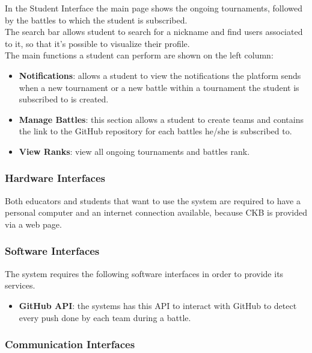 \newpage

In the Student Interface the main page shows the ongoing tournaments, followed by the battles to which the student is subscribed. \\The search bar allows student to search for a nickname and find users associated to it, so that it's possible to visualize their profile. \\The main functions a student can perform are shown on the left column:
\begin{itemize}
    \item \textbf{Notifications}: allows a student to view the notifications the platform sends when a new tournament or a new battle within a tournament the student is subscribed to is created.
    \item \textbf{Manage Battles}: this section allows a student to create teams and contains the link to the GitHub repository for each battles he/she is subscribed to. 
    \item \textbf{View Ranks}: view all ongoing tournaments and battles rank.
\end{itemize}


\vspace{60pt}

\subsubsection{Hardware Interfaces}

Both educators and students that want to use the system are required to have a personal computer and an internet connection available, because CKB is provided via a web page.

\vspace{20pt}

\subsubsection{Software Interfaces}

The system requires the following software interfaces in order to provide its services. 
\begin{itemize}
    \item \textbf{GitHub API}: the systems has this API to interact with GitHub to detect every push done by each team during a battle. 
\end{itemize}

\vspace{20pt}

\subsubsection{Communication Interfaces}

